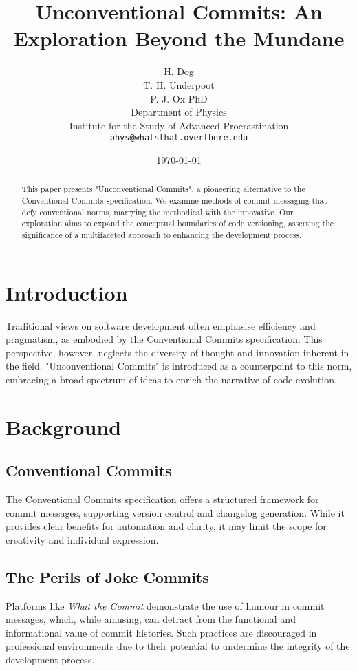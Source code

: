 \documentclass[12pt]{article}
\title{Unconventional Commits: An Exploration Beyond the Mundane}
\author{
    H. Dog \\
    T. H. Underpoot \\
    P. J. Ox PhD \\
    Department of Physics \\
    Institute for the Study of Advanced Procrastination \\
    \texttt{phys@whatsthat.overthere.edu}
}
\date{\today}
\begin{document}
\maketitle

\begin{abstract}
    This paper presents "Unconventional Commits", a pioneering alternative to the Conventional Commits specification. We examine methods of commit messaging that defy conventional norms, marrying the methodical with the innovative. Our exploration aims to expand the conceptual boundaries of code versioning, asserting the significance of a multifaceted approach to enhancing the development process.
\end{abstract}

\section{Introduction}
    Traditional views on software development often emphasise efficiency and pragmatism, as embodied by the Conventional Commits specification. This perspective, however, neglects the diversity of thought and innovation inherent in the field. "Unconventional Commits" is introduced as a counterpoint to this norm, embracing a broad spectrum of ideas to enrich the narrative of code evolution.

\section{Background}
    \subsection{Conventional Commits}
        The Conventional Commits specification offers a structured framework for commit messages, supporting version control and changelog generation. While it provides clear benefits for automation and clarity, it may limit the scope for creativity and individual expression.

    \subsection{The Perils of Joke Commits}
        Platforms like \textit{What the Commit} demonstrate the use of humour in commit messages, which, while amusing, can detract from the functional and informational value of commit histories. Such practices are discouraged in professional environments due to their potential to undermine the integrity of the development process.
\end{document}
